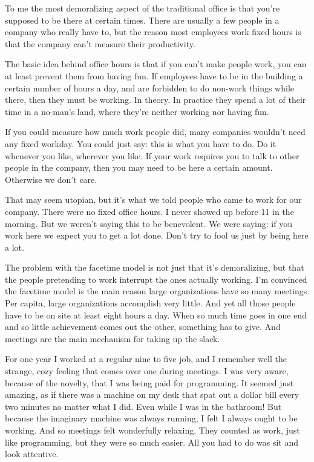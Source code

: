 To me the most demoralizing aspect of the traditional office is that
you're supposed to be there at certain times. There are usually a few
people in a company who really have to, but the reason most employees
work fixed hours is that the company can't measure their productivity.

The basic idea behind office hours is that if you can't make people
work, you can at least prevent them from having fun. If employees have
to be in the building a certain number of hours a day, and are forbidden
to do non-work things while there, then they must be working. In theory.
In practice they spend a lot of their time in a no-man's land, where
they're neither working nor having fun.

If you could measure how much work people did, many companies wouldn't
need any fixed workday. You could just say: this is what you have to do.
Do it whenever you like, wherever you like. If your work requires you to
talk to other people in the company, then you may need to be here a
certain amount. Otherwise we don't care.

That may seem utopian, but it's what we told people who came to work for
our company. There were no fixed office hours. I never showed up before
11 in the morning. But we weren't saying this to be benevolent. We were
saying: if you work here we expect you to get a lot done. Don't try to
fool us just by being here a lot.

The problem with the facetime model is not just that it's demoralizing,
but that the people pretending to work interrupt the ones actually
working. I'm convinced the facetime model is the main reason large
organizations have so many meetings. Per capita, large organizations
accomplish very little. And yet all those people have to be on site at
least eight hours a day. When so much time goes in one end and so little
achievement comes out the other, something has to give. And meetings are
the main mechanism for taking up the slack.

For one year I worked at a regular nine to five job, and I remember well
the strange, cozy feeling that comes over one during meetings. I was
very aware, because of the novelty, that I was being paid for
programming. It seemed just amazing, as if there was a machine on my
desk that spat out a dollar bill every two minutes no matter what I did.
Even while I was in the bathroom! But because the imaginary machine was
always running, I felt I always ought to be working. And so meetings
felt wonderfully relaxing. They counted as work, just like programming,
but they were so much easier. All you had to do was sit and look
attentive.

